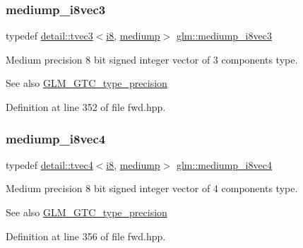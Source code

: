 \subsubsection{\texorpdfstring{mediump\+\_\+i8vec3}{mediump\_i8vec3}}
{\footnotesize\ttfamily typedef \hyperlink{structglm_1_1detail_1_1tvec3}{detail\+::tvec3}$<$\hyperlink{group__gtc__type__precision_gaae064be68b7d36cd7910c16e8ad18bba}{i8}, \hyperlink{namespaceglm_a0f04f086094c747d227af4425893f545a6416f3ea0c9025fb21ed50c4d6620482}{mediump}$>$ \hyperlink{group__gtc__type__precision_ga91b40a693c1db26a7cc544339b326df3}{glm\+::mediump\+\_\+i8vec3}}

Medium precision 8 bit signed integer vector of 3 components type. \begin{DoxySeeAlso}{See also}
\hyperlink{group__gtc__type__precision}{G\+L\+M\+\_\+\+G\+T\+C\+\_\+type\+\_\+precision} 
\end{DoxySeeAlso}


Definition at line 352 of file fwd.\+hpp.

\mbox{\label{group__gtc__type__precision_gad41bf4bfa504dc1191623ff77151d01f}} 
\subsubsection{\texorpdfstring{mediump\+\_\+i8vec4}{mediump\_i8vec4}}
{\footnotesize\ttfamily typedef \hyperlink{structglm_1_1detail_1_1tvec4}{detail\+::tvec4}$<$\hyperlink{group__gtc__type__precision_gaae064be68b7d36cd7910c16e8ad18bba}{i8}, \hyperlink{namespaceglm_a0f04f086094c747d227af4425893f545a6416f3ea0c9025fb21ed50c4d6620482}{mediump}$>$ \hyperlink{group__gtc__type__precision_gad41bf4bfa504dc1191623ff77151d01f}{glm\+::mediump\+\_\+i8vec4}}

Medium precision 8 bit signed integer vector of 4 components type. \begin{DoxySeeAlso}{See also}
\hyperlink{group__gtc__type__precision}{G\+L\+M\+\_\+\+G\+T\+C\+\_\+type\+\_\+precision} 
\end{DoxySeeAlso}


Definition at line 356 of file fwd.\+hpp.

\mbox{\label{group__gtc__type__precision_ga4611997edb6c61606daa11990cf08798}} 
